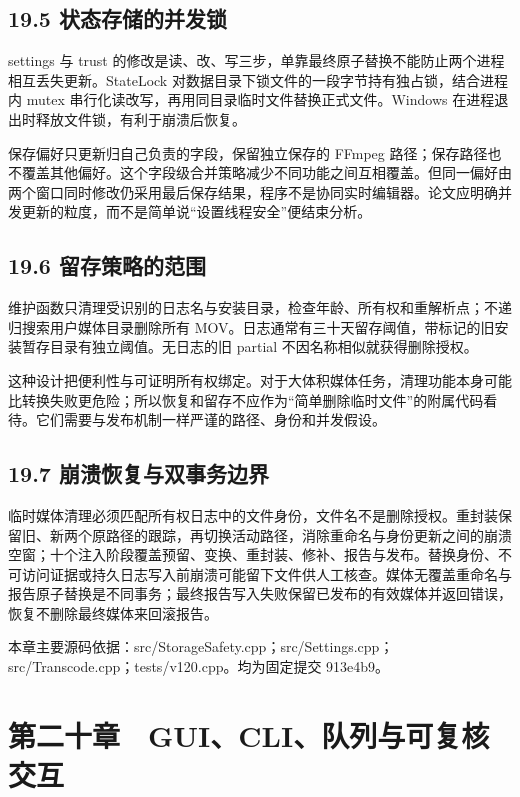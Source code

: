 \documentclass[UTF8,zihao=-4,openany]{ctexbook}
\begin{document}
\section*{19.5 状态存储的并发锁}
settings 与 trust 的修改是读、改、写三步，单靠最终原子替换不能防止两个进程相互丢失更新。StateLock 对数据目录下锁文件的一段字节持有独占锁，结合进程内 mutex 串行化读改写，再用同目录临时文件替换正式文件。Windows 在进程退出时释放文件锁，有利于崩溃后恢复。

保存偏好只更新归自己负责的字段，保留独立保存的 FFmpeg 路径；保存路径也不覆盖其他偏好。这个字段级合并策略减少不同功能之间互相覆盖。但同一偏好由两个窗口同时修改仍采用最后保存结果，程序不是协同实时编辑器。论文应明确并发更新的粒度，而不是简单说“设置线程安全”便结束分析。


\section*{19.6 留存策略的范围}
维护函数只清理受识别的日志名与安装目录，检查年龄、所有权和重解析点；不递归搜索用户媒体目录删除所有 MOV。日志通常有三十天留存阈值，带标记的旧安装暂存目录有独立阈值。无日志的旧 partial 不因名称相似就获得删除授权。

这种设计把便利性与可证明所有权绑定。对于大体积媒体任务，清理功能本身可能比转换失败更危险；所以恢复和留存不应作为“简单删除临时文件”的附属代码看待。它们需要与发布机制一样严谨的路径、身份和并发假设。


\section*{19.7 崩溃恢复与双事务边界}
临时媒体清理必须匹配所有权日志中的文件身份，文件名不是删除授权。重封装保留旧、新两个原路径的跟踪，再切换活动路径，消除重命名与身份更新之间的崩溃空窗；十个注入阶段覆盖预留、变换、重封装、修补、报告与发布。替换身份、不可访问证据或持久日志写入前崩溃可能留下文件供人工核查。媒体无覆盖重命名与报告原子替换是不同事务；最终报告写入失败保留已发布的有效媒体并返回错误，恢复不删除最终媒体来回滚报告。


\par\small 本章主要源码依据：src/StorageSafety.cpp；src/Settings.cpp；src/Transcode.cpp；tests/v120.cpp。均为固定提交 913e4b9。\normalsize

\chapter*{第二十章　GUI、CLI、队列与可复核交互}
\end{document}

